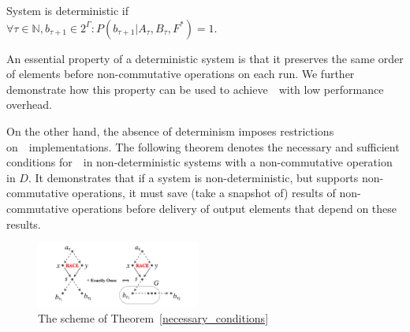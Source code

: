 \begin{definition}{System is deterministic}
if\\ 
$\forall{\tau\in{\mathbb{N}}, b_{\tau+1}\in{2^{\Gamma}}}:P(b_{\tau+1}|A_{\tau},B_\tau,F^{*})=1$.
\end{definition}

An essential property of a deterministic system is that it preserves the same order of elements before non-commutative operations on each run. We further demonstrate how this property can be used to achieve~\eo\ with low performance overhead.

On the other hand, the absence of determinism imposes restrictions on~\eo\ implementations. The following theorem denotes the necessary and sufficient conditions for~\eo\ in non-deterministic systems with a non-commutative operation in $D$. It demonstrates that if a system is non-deterministic, but supports non-commutative operations, it must save (take a snapshot of) results of non-commutative operations before delivery of output elements that depend on these results.

\begin{figure}[htbp]
  \centering
  \includegraphics[width=0.48\textwidth]{pics/theorem-pic}
  \caption{The scheme of Theorem~\ref{necessary_conditions}}
  \label {theorem-pic}
\end{figure}

